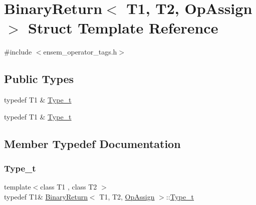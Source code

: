 \hypertarget{structBinaryReturn_3_01T1_00_01T2_00_01OpAssign_01_4}{}\section{Binary\+Return$<$ T1, T2, Op\+Assign $>$ Struct Template Reference}
\label{structBinaryReturn_3_01T1_00_01T2_00_01OpAssign_01_4}


{\ttfamily \#include $<$ensem\+\_\+operator\+\_\+tags.\+h$>$}

\subsection*{Public Types}
\begin{DoxyCompactItemize}
\item 
typedef T1 \& \mbox{\hyperlink{structBinaryReturn_3_01T1_00_01T2_00_01OpAssign_01_4_a53342a562eafe32bec01f522b2e76d49}{Type\+\_\+t}}
\item 
typedef T1 \& \mbox{\hyperlink{structBinaryReturn_3_01T1_00_01T2_00_01OpAssign_01_4_a53342a562eafe32bec01f522b2e76d49}{Type\+\_\+t}}
\end{DoxyCompactItemize}


\subsection{Member Typedef Documentation}
\mbox{\label{structBinaryReturn_3_01T1_00_01T2_00_01OpAssign_01_4_a53342a562eafe32bec01f522b2e76d49}} 
\subsubsection{\texorpdfstring{Type\_t}{Type\_t}\hspace{0.1cm}{\footnotesize\ttfamily [1/2]}}
{\footnotesize\ttfamily template$<$class T1 , class T2 $>$ \\
typedef T1\& \mbox{\hyperlink{structBinaryReturn}{Binary\+Return}}$<$ T1, T2, \mbox{\hyperlink{structOpAssign}{Op\+Assign}} $>$\+::\mbox{\hyperlink{structBinaryReturn_3_01T1_00_01T2_00_01OpAssign_01_4_a53342a562eafe32bec01f522b2e76d49}{Type\+\_\+t}}}


